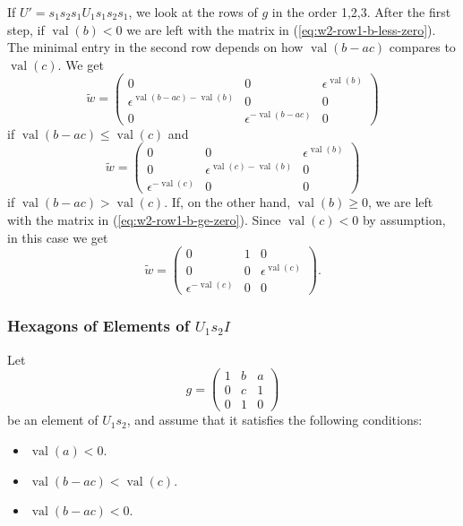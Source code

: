 \documentclass{amsart}
\theoremstyle{definition}
\def\e{\epsilon}
\def\w{\widetilde{w}}
\def\val{\mathop{\mathrm{val}}}
\begin{document}
  If $U' = s_1s_2s_1 U_1 s_1s_2s_1$, we look at the rows of $g$ in the order
  1,2,3.  After the first step, if $\val(b) < 0$ we are left with the matrix in
  (\ref{eq:w2-row1-b-less-zero}).  The minimal entry in the second row depends
  on how $\val(b-ac)$ compares to $\val(c)$.  We get
  \begin{equation*}
    \w = \begin{pmatrix}
      0 & 0 & \e^{\val(b)} \\
      \e^{\val(b-ac)-\val(b)} & 0 & 0  \\
      0 & \e^{-\val(b-ac)} & 0
    \end{pmatrix}
  \end{equation*}
  if $\val(b-ac) \le \val(c)$ and 
  \begin{equation*}
    \w = \begin{pmatrix}
      0 & 0 & \e^{\val(b)} \\
      0 & \e^{\val(c) - \val(b)} & 0  \\
      \e^{-\val(c)} & 0 & 0
    \end{pmatrix}
  \end{equation*}
  if $\val(b-ac) > \val(c)$.  If, on the other hand, $\val(b) \ge 0$, we are
  left with the matrix in (\ref{eq:w2-row1-b-ge-zero}).  Since $\val(c) < 0$ by
  assumption, in this case we get
  \begin{equation*}
    \w = \begin{pmatrix}
      0 & 1 & 0 \\
      0 & 0 & \e^{\val(c)} \\
      \e^{-\val(c)} & 0 & 0
    \end{pmatrix}.
  \end{equation*}

  \subsubsection{Hexagons of Elements of $U_1 s_2 I$}
  \label{sec:hexagons-u-s2}
  Let
  \begin{equation*}
    g =
    \begin{pmatrix}
      1 & b & a \\
      0 & c & 1 \\
      0 & 1 & 0
    \end{pmatrix}
  \end{equation*}
  be an element of $U_1 s_2$, and assume that it satisfies the following
  conditions:
  \begin{itemize}
    \item $\val(a) < 0$.
    \item $\val(b-ac) < \val(c)$.
    \item $\val(b-ac) < 0$.
  \end{itemize}
\end{document}
